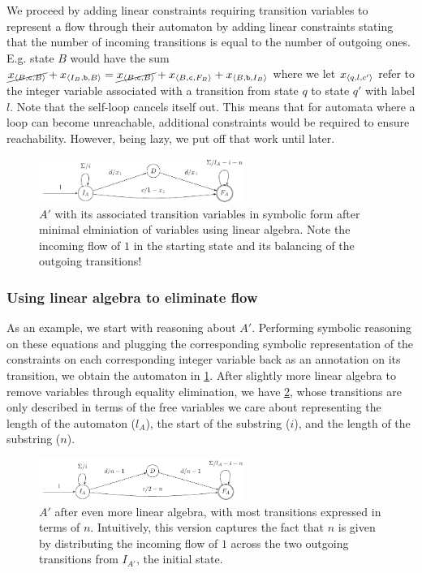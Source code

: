 We proceed by adding linear constraints requiring transition variables to
represent a flow through their automaton by adding linear constraints stating
that the number of incoming transitions is equal to the number of outgoing ones.
E.g. state $B$ would have the sum $\cancel{x_{\left\langle B, \texttt{c}, B\right\rangle}} +
x_{\left\langle I_B, \texttt{b}, B\right\rangle} = \cancel{x_{\left\langle B, \texttt{c}, B\right\rangle}}  +
x_{\left\langle B, \texttt{c}, F_B\right\rangle} + x_{\left\langle B, \texttt{b}, I_B\right\rangle}$ where we let
$x_{\left\langle q, l, c'\right\rangle}$ refer to the integer variable associated with a
transition from state $q$ to state $q'$ with label $l$. Note that the self-loop
cancels itself out. This means that for automata where a loop can become
unreachable, additional constraints would be required to ensure reachability.
However, being lazy, we put off that work until later.

\begin{figure}[ht]
  \centering 
  \includegraphics[width=0.6\textwidth]{a_1}
  \caption{ $A'$ with its associated transition variables in symbolic form after
  minimal elminiation of variables using linear algebra. Note the incoming flow
  of $1$ in the starting state and its balancing of the outgoing transitions!
  }\label{fig:a_1}
\end{figure}

\subsubsection{Using linear algebra to eliminate flow}\label{sec:intuition:algebra}
As an example, we start with reasoning about $A'$. Performing symbolic reasoning
on these equations and plugging the corresponding symbolic representation of the
constraints on each corresponding integer variable back as an annotation on its
transition, we obtain the automaton in \cref{fig:a_1}. After slightly more
linear algebra to remove variables through equality elimination, we have
\cref{fig:a_2}, whose transitions are only described in terms of the free
variables we care about representing the length of the automaton ($l_A$), the
start of the substring ($i$), and the length of the substring ($n$).

\begin{figure}[ht]
  \centering 
  \includegraphics[width=0.6\textwidth]{a_2}
  \caption{ $A'$ after even more linear algebra, with most transitions expressed
  in terms of $n$. Intuitively, this version captures the fact that $n$ is given
  by distributing the incoming flow of $1$ across the two outgoing transitions
  from $I_{A'}$, the initial state.}
  \label{fig:a_2}
\end{figure}

